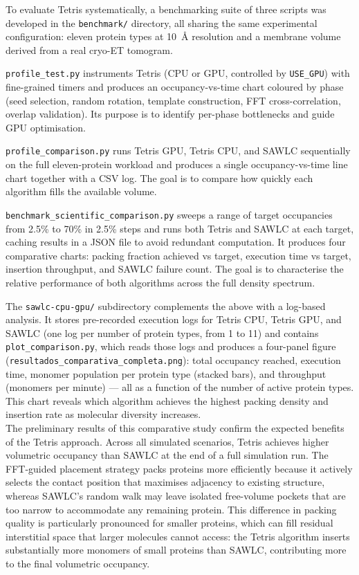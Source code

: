 To evaluate Tetris systematically, a benchmarking suite of three scripts was developed in the \texttt{benchmark/} directory, all sharing the same experimental configuration: eleven protein types at 10~Å resolution and a membrane volume derived from a real cryo-ET tomogram.

\texttt{profile\_test.py} instruments Tetris (CPU or GPU, controlled by \texttt{USE\_GPU}) with fine-grained timers and produces an occupancy-vs-time chart coloured by phase (seed selection, random rotation, template construction, FFT cross-correlation, overlap validation). Its purpose is to identify per-phase bottlenecks and guide GPU optimisation.

\texttt{profile\_comparison.py} runs Tetris GPU, Tetris CPU, and SAWLC sequentially on the full eleven-protein workload and produces a single occupancy-vs-time line chart together with a CSV log. The goal is to compare how quickly each algorithm fills the available volume.

\texttt{benchmark\_scientific\_comparison.py} sweeps a range of target occupancies from 2.5\% to 70\% in 2.5\% steps and runs both Tetris and SAWLC at each target, caching results in a JSON file to avoid redundant computation. It produces four comparative charts: packing fraction achieved vs target, execution time vs target, insertion throughput, and SAWLC failure count. The goal is to characterise the relative performance of both algorithms across the full density spectrum.

The \texttt{sawlc-cpu-gpu/} subdirectory complements the above with a log-based analysis. It stores pre-recorded execution logs for Tetris CPU, Tetris GPU, and SAWLC (one log per number of protein types, from 1 to 11) and contains \texttt{plot\_comparison.py}, which reads those logs and produces a four-panel figure (\texttt{resultados\_comparativa\_completa.png}): total occupancy reached, execution time, monomer population per protein type (stacked bars), and throughput (monomers per minute) — all as a function of the number of active protein types. This chart reveals which algorithm achieves the highest packing density and insertion rate as molecular diversity increases.\\

The preliminary results of this comparative study confirm the expected benefits of the Tetris
approach. Across all simulated scenarios, Tetris achieves higher volumetric occupancy than
SAWLC at the end of a full simulation run. The FFT-guided placement strategy packs proteins more
efficiently because it actively selects the contact position that maximises adjacency to existing
structure, whereas SAWLC's random walk may leave isolated free-volume pockets that are too
narrow to accommodate any remaining protein. This difference in packing quality is particularly
pronounced for smaller proteins, which can fill residual interstitial space that larger molecules
cannot access: the Tetris algorithm inserts substantially more monomers of small proteins than
SAWLC, contributing more to the final volumetric occupancy.\\       

